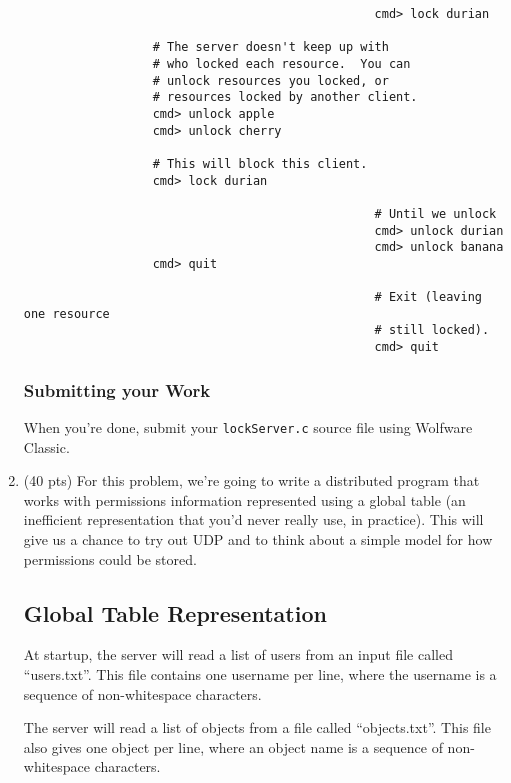 \documentclass{article}
\begin{document}
\begin{enumerate}
\begin{verbatim}
                                                 cmd> lock durian

                  # The server doesn't keep up with
                  # who locked each resource.  You can
                  # unlock resources you locked, or
                  # resources locked by another client.
                  cmd> unlock apple
                  cmd> unlock cherry

                  # This will block this client.
                  cmd> lock durian

                                                 # Until we unlock 
                                                 cmd> unlock durian
                                                 cmd> unlock banana
                  cmd> quit

                                                 # Exit (leaving one resource
                                                 # still locked).
                                                 cmd> quit
\end{verbatim}

\subsubsection*{Submitting your Work}

When you're done, submit your \texttt{lockServer.c} source file using Wolfware Classic.

\item (40 pts) For this problem, we're going to write a distributed
  program that works with permissions information represented using a
  global table (an inefficient representation that you'd never really
  use, in practice).  This will give
  us a chance to try out UDP and to think about a simple model for how
  permissions could be stored.

\subsection*{Global Table Representation}

  At startup, the server will read a list of users from an input file
  called ``users.txt''.  This file contains one username per line, where
  the username is a sequence of non-whitespace characters.

  The server will read a list of objects from a file called
  ``objects.txt''.  This file also gives one object per line, where an
  object name is a sequence of non-whitespace characters.


\end{enumerate}
\end{document}
